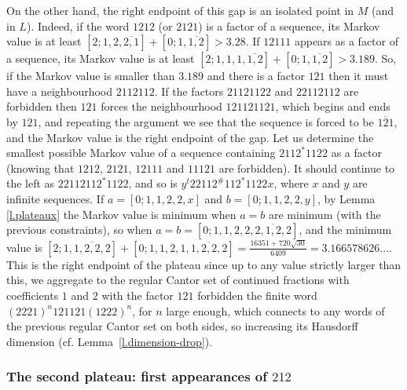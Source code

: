 \documentclass[10pt]{amsart}
\numberwithin{equation}{section}
\theoremstyle{definition}
\begin{document}
On the other hand, the right endpoint of this gap is an isolated point in $M$
(and in $L$). Indeed, if the word $1212$ (or $2121$) is a factor of a sequence,
its Markov value is at least $[2;1,2,\overline{2,1}]+[0;1,\overline{1,2}]>3.28$.
If $12111$ appears as a factor of a sequence, its Markov value is at least
$[2;1,1,1,\overline{1,2}]+[0;1,\overline{1,2}]>3.189$. So, if the Markov value
is smaller than $3.189$ and there is a factor $121$ then it must have a
neighbourhood $2112112$. If the factors $21121122$ and $22112112$ are forbidden
then $121$ forces the neighbourhood $121121121$, which begins and ends by $121$,
and repeating the argument we see that the sequence is forced to be
$\overline{121}$, and the Markov value is the right endpoint of the gap. Let us
determine the smallest possible Markov value of a sequence containing
$2112^*1122$ as a factor (knowing that $1212$, $2121$, $12111$ and $11121$ are
forbidden). It should continue to the left as $22112112^*1122$, and so is
$y^{t}22112^{\#}112^*1122x$, where $x$ and $y$ are infinite sequences. If
$a=[0;1,1,2,2,x]$ and $b=[0;1,1,2,2,y]$, by Lemma \ref{l.plateaux} the Markov
value is minimum when $a=b$ are minimum (with the previous constraints), so when
$a=b=[0;1,1,2,2,\overline{2,1,2,2}]$, and the minimum value is
$[2;1,\overline{1,2,2,2}]+[0;1,1,2,1,\overline{1,2,2,2}]=\frac{16351+720\sqrt{30}}{6409}=3.166578626...$.
This is the right endpoint of the plateau since up to any value strictly larger
than this, we aggregate to the regular Cantor set of continued fractions with
coefficients $1$ and $2$ with the factor $121$ forbidden the finite word
$(2221)^n 121121 (1222)^n$, for $n$ large enough, which connects to any words of
the previous regular Cantor set on both sides, so increasing its Hausdorff
dimension (cf. Lemma~\ref{l.dimension-drop}).  

\subsubsection{The second plateau: first appearances of $212$} 
\end{document}
